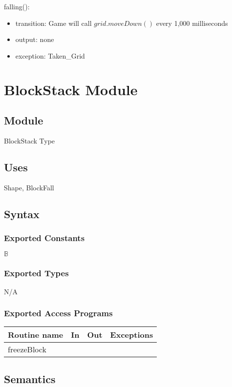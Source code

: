 \documentclass[12pt]{article}
\begin{document}
\noindent falling():
\begin{itemize}
\item transition: Game will call $grid.moveDown()$ every 1,000 milliseconds
\item output: none
\item exception: Taken\_Grid
\end{itemize}

\newpage

\section* {BlockStack Module}

\subsection*{Module}

BlockStack Type

\subsection* {Uses}

Shape, BlockFall

\subsection* {Syntax}

\subsubsection* {Exported Constants}
$\mathbb{B}$
\subsubsection* {Exported Types}
N/A
\subsubsection* {Exported Access Programs}

\begin{tabular}{| l | l | l | l |}
\hline
\textbf{Routine name} & \textbf{In} & \textbf{Out} & \textbf{Exceptions}\\
\hline
freezeBlock &  &  & \\
\hline
\end{tabular}

\subsection* {Semantics}
\end{document}
